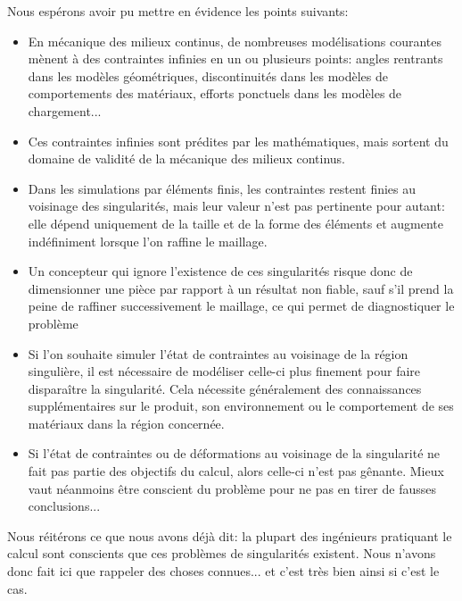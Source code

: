 Nous espérons avoir pu mettre en évidence les points suivants:
\begin{itemize}
  \item En mécanique des milieux continus, de nombreuses modélisations courantes mènent à des contraintes infinies en un ou plusieurs points: angles rentrants dans les modèles 	géométriques, discontinuités dans les modèles de comportements des matériaux, efforts 	ponctuels dans les modèles de chargement...
  \item Ces contraintes infinies sont prédites par les mathématiques, mais sortent du domaine de validité de la mécanique des milieux continus.
  \item Dans les simulations par éléments finis, les contraintes restent finies au voisinage des singularités, mais leur valeur n'est pas pertinente pour autant: elle dépend uniquement de la taille et de la forme des éléments et augmente indéfiniment lorsque l'on raffine le maillage.
  \item Un concepteur qui ignore l'existence de ces singularités risque donc de dimensionner une pièce par rapport à un résultat non fiable, sauf s'il prend la peine de raffiner successivement le maillage, ce qui permet de diagnostiquer le problème 
  \item Si l'on souhaite simuler l'état de contraintes au voisinage de la région singulière, il est nécessaire de modéliser celle-ci plus finement pour faire disparaître la singularité. Cela nécessite généralement des connaissances supplémentaires sur le produit, son environnement ou le comportement de ses matériaux dans la région concernée.
  \item Si l'état de contraintes ou de déformations au voisinage de la singularité ne fait pas partie des objectifs du calcul, alors celle-ci n'est pas gênante. Mieux vaut néanmoins être conscient du problème pour ne pas en tirer de fausses conclusions...
\end{itemize}

\medskip
Nous réitérons ce que nous avons déjà dit: la plupart des ingénieurs pratiquant le calcul sont conscients que ces problèmes de singularités existent. Nous n'avons donc fait ici que rappeler des choses connues... et c'est très bien ainsi si c'est le cas. 













